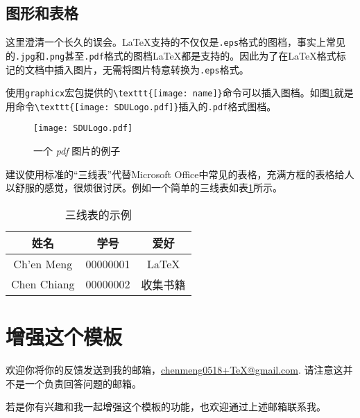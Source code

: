 \section{图形和表格}
这里澄清一个长久的误会。\LaTeX{}支持的不仅仅是\texttt{.eps}格式的图档，事实上常见的\texttt{.jpg}和\texttt{.png}甚至\texttt{.pdf}格式的图档\LaTeX{}都是支持的。因此为了在\LaTeX{}格式标记的文档中插入图片，无需将图片特意转换为\texttt{.eps}格式。

使用\texttt{graphicx}宏包提供的\verb|\texttt{[image: name]}|命令可以插入图档。如图\ref{Fig:pdf}就是用命令\verb|\texttt{[image: SDULogo.pdf]}|插入的\texttt{.pdf}格式图档。
\begin{figure}
[htbp]
\centering
\texttt{[image: SDULogo.pdf]}
\caption{一个 \emph{pdf} 图片的例子}\label{Fig:pdf}
\end{figure}

建议使用标准的“三线表”代替Microsoft Office中常见的表格，充满方框的表格给人以舒服的感觉，很烦很讨厌。例如一个简单的三线表如表\ref{Tab:3lines}所示。
\begin{table}
[htbp]
\centering
\caption{三线表的示例}\label{Tab:3lines}
\begin{tabular}
{ccc}
\toprule
姓名& 学号& 爱好\\
\hline
Ch'en Meng& 00000001& \LaTeX{}\\
Chen Chiang& 00000002& 收集书籍\\
\bottomrule
\end{tabular}
\end{table}

\chapter{增强这个模板}
欢迎你将你的反馈发送到我的邮箱，\href{mailto:chenmeng0518+TeX@gmail.com}{chenmeng0518+TeX@gmail.com}. 请注意这并不是一个负责回答问题的邮箱。

若是你有兴趣和我一起增强这个模板的功能，也欢迎通过上述邮箱联系我。
